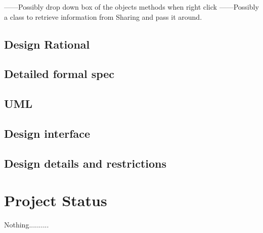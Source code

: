 \documentclass[12pt]{article}
\begin{document}


------Possibly drop down box of the objects methods when right click
------Possibly a class to retrieve information from Sharing and pass it around.

\subsection{Design Rational}



\subsection{Detailed formal spec}

\subsection{UML}

\subsection{Design interface}

\subsection{Design details and restrictions}


\section{Project Status}

Nothing..........
%




%




%




%
\end{document}
